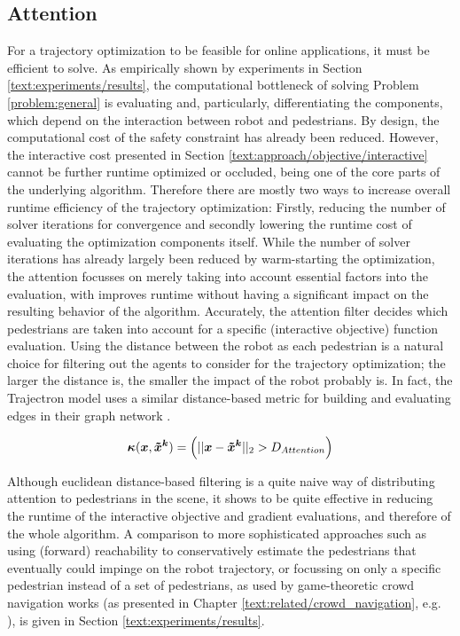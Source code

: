 \subsection{Attention}
\label{text:approach/runtime/filtering}
For a trajectory optimization to be feasible for online applications, it must be efficient to solve. As empirically shown by experiments in Section \ref{text:experiments/results}, the computational bottleneck of solving Problem \ref{problem:general} is evaluating and, particularly, differentiating the components, which depend on the interaction between robot and pedestrians. By design, the computational cost of the safety constraint has already been reduced. However, the interactive cost presented in Section \ref{text:approach/objective/interactive} cannot be further runtime optimized or occluded, being one of the core parts of the underlying algorithm. Therefore there are mostly two ways to increase overall runtime efficiency of the trajectory optimization: Firstly, reducing the number of solver iterations for convergence and secondly lowering the runtime cost of evaluating the optimization components itself.
\newline
While the number of solver iterations has already largely been reduced by warm-starting the optimization, the attention focusses on merely taking into account essential factors into the evaluation, with improves runtime without having a significant impact on the resulting behavior of the algorithm. Accurately, the attention filter decides which pedestrians are taken into account for a specific (interactive objective) function evaluation.
\newline
Using the distance between the robot as each pedestrian is a natural choice for filtering out the agents to consider for the trajectory optimization; the larger the distance is, the smaller the impact of the robot probably is. In fact, the Trajectron model uses a similar distance-based metric for building and evaluating edges in their graph network \cite{Salzmann2020}.

\begin{equation}
\attention(\x, \xped[k]) = \left( ||\x - \xped[k]||_2 > D_{Attention} \right)
\end{equation}

Although euclidean distance-based filtering is a quite naive way of distributing attention to pedestrians in the scene, it shows to be quite effective in reducing the runtime of the interactive objective and gradient evaluations, and therefore of the whole algorithm. A comparison to more sophisticated approaches such as using (forward) reachability to conservatively estimate the pedestrians that eventually could impinge on the robot trajectory, or focussing on only a specific pedestrian instead of a set of pedestrians, as used by game-theoretic crowd navigation works (as presented in Chapter \ref{text:related/crowd_navigation}, e.g.\,  \cite{Bouzat2014}\cite{Nikolaidis2017}), is given in Section \ref{text:experiments/results}.